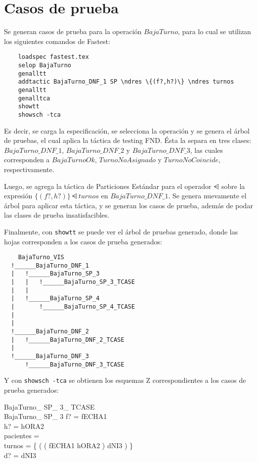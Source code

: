 \documentclass[12pt]{article}
\begin{document}
\section*{Casos de prueba}

Se generan casos de prueba para la operación $BajaTurno$, para lo cual se utilizan los siguientes comandos de Fastest:

\begin{verbatim}
    loadspec fastest.tex
    selop BajaTurno
    genalltt
    addtactic BajaTurno_DNF_1 SP \ndres \{(f?,h?)\} \ndres turnos
    genalltt
    genalltca
    showtt
    showsch -tca
\end{verbatim}

Es decir, se carga la especificación, se selecciona la operación y se genera el árbol de pruebas, el cual aplica la táctica de testing FND. Ésta la separa en tres clases: $BajaTurno\_DNF\_1$, $BajaTurno\_DNF\_2$ y $BajaTurno\_DNF\_3$, las cuales corresponden a $BajaTurnoOk$, $TurnoNoAsignado$ y $TurnoNoCoincide$, respectivamente.

Luego, se agrega la táctica de Particiones Estándar para el operador $\ndres$ sobre la expresión $\{(f?,h?)\} \ndres turnos$ en $BajaTurno\_DNF\_1$. Se genera nuevamente el árbol para aplicar esta táctica, y se generan los casos de prueba, además de podar las clases de prueba insatisfacibles.

Finalmente, con \verb|showtt| se puede ver el árbol de pruebas generado, donde las hojas corresponden a los casos de prueba generados:

\begin{verbatim}
    BajaTurno_VIS
  !______BajaTurno_DNF_1
  |	  !______BajaTurno_SP_3
  |	  |	  !______BajaTurno_SP_3_TCASE
  |	  |
  |	  !______BajaTurno_SP_4
  |	  	  !______BajaTurno_SP_4_TCASE
  |	
  |
  !______BajaTurno_DNF_2
  |	  !______BajaTurno_DNF_2_TCASE
  |
  !______BajaTurno_DNF_3
  	  !______BajaTurno_DNF_3_TCASE
\end{verbatim}

Y con \verb|showsch -tca| se obtienen los esquemas Z correspondientes a los casos de prueba generados:

\begin{schema}{BajaTurno\_ SP\_ 3\_ TCASE}\\
 BajaTurno\_ SP\_ 3 
\where
 f? = fECHA1 \\
 h? = hORA2 \\
 pacientes =~\emptyset \\
 turnos = \{ ( ( fECHA1 \mapsto hORA2 ) \mapsto dNI3 ) \} \\
 d? = dNI3
\end{schema}
\end{document}
